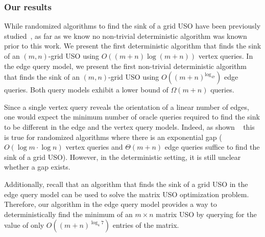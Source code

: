 \documentclass[runningheads,a4paper]{llncs}
\begin{document}



\subsubsection{Our results}

While randomized algorithms to find the sink of a grid USO have been previously studied~\cite{grid05,linepoint,grid08,falkthesis}, as far as we know no non-trivial deterministic algorithm was known prior to this work. 
We present the first deterministic algorithm that finds the sink of an $(m,n)$-grid USO using $O((m+n)\log (m+n))$ vertex queries.
In the edge query model, 
we present the first non-trivial deterministic algorithm that finds the sink of an $(m, n)$-grid USO using $O((m+n)^{\log_47})$ edge queries. 
Both query models exhibit a lower bound of $\Omega(m+n)$ queries.

Since a single vertex query reveals the orientation of a linear number of edges, one would expect the minimum number of  oracle queries required to find the sink to be different in the edge and the vertex query models.
Indeed, as shown ~\citet{grid08} this is true for randomized algorithms where there is an exponential gap ($O(\log m\cdot \log n)$ vertex queries and $\Theta(m+n)$ edge queries suffice to find the sink of a grid USO).
However, in the deterministic setting, it is still unclear whether a gap exists.

Additionally, recall that an algorithm that finds the sink of a grid USO in the edge query model can be used to solve the matrix USO optimization problem. 
Therefore, our algorithm in the edge query model provides a way to deterministically find the minimum of an $m\times n$ matrix USO by querying for the value of only $O((m+n)^{\log_4 7})$ entries of the matrix. 
\end{document}
